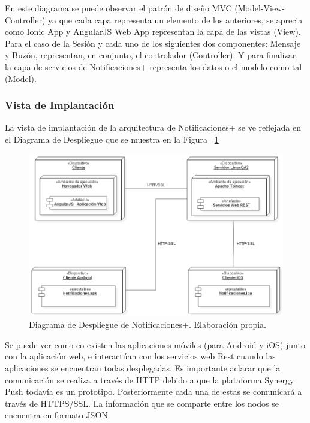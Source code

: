 En este diagrama se puede observar el patrón de diseño MVC (Model-View-Controller) ya que cada capa representa un elemento de los anteriores, se aprecia como Ionic App y AngularJS Web App representan la capa de las vistas (View). Para el caso de la Sesión y cada uno de los siguientes dos componentes: Mensaje y Buzón, representan, en conjunto, el controlador (Controller). Y para finalizar, la capa de servicios de Notificaciones+ representa los datos o el modelo como tal (Model).


\subsubsection{Vista de Implantación}
La vista de implantación de la arquitectura de Notificaciones+ se ve reflejada en el Diagrama de Despliegue que se muestra en la Figura ~\ref{fig:despliegue}

\begin{figure}[H]
  \centering
  \includegraphics[scale=0.4,type=png,ext=.png,read=.png,angle=0,origin=c]{imagenes/Diagrama_de_Despliegue}
  \caption{Diagrama de Despliegue de Notificaciones+. Elaboración propia.}
  \label{fig:despliegue}
\end{figure}


Se puede ver como co-existen las aplicaciones móviles (para Android y iOS) junto con la aplicación web, e interactúan con los servicios web Rest cuando las aplicaciones se encuentran todas desplegadas.
Es importante aclarar que la comunicación se realiza a través de HTTP debido a que la plataforma Synergy Push todavía es un prototipo. Posteriormente cada una de estas se comunicará a través de HTTPS/SSL. La información que se comparte entre los nodos se encuentra en formato JSON.


